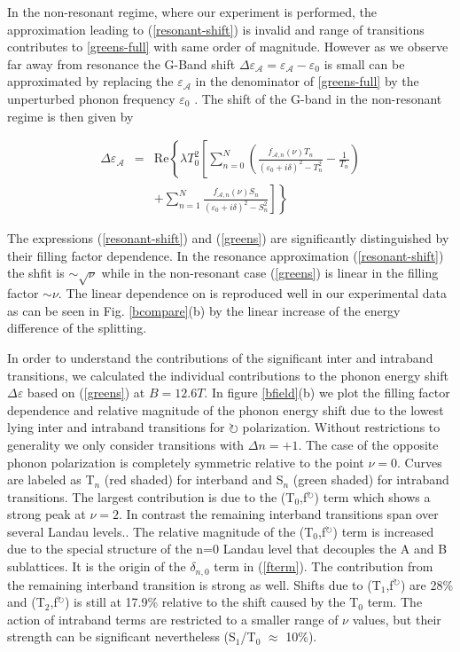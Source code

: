 \documentclass[prl,aps,superscriptaddress,showpacs,reprint]{revtex4-1}
\begin{document}
In the non-resonant regime, where our experiment is performed, the approximation leading to (\ref{resonant-shift}) is invalid and range of transitions contributes to \ref{greens-full} with same order of magnitude. However as we observe far away from resonance the G-Band shift $\Delta\varepsilon_{\mathcal{A}} = \varepsilon_{\mathcal{A}} - \varepsilon_0$ is small can be approximated by replacing the $\varepsilon_{\mathcal{A}}$ in the denominator of \ref{greens-full} by the unperturbed phonon frequency $\varepsilon_0$ \cite{ando2007magnetic}. The shift of the G-band in the non-resonant regime is then given by

\begin{eqnarray}
\label{greens}
\Delta\varepsilon_{\mathcal{A}} &=& \mathrm{Re}\left\lbrace \lambda T_0^2 \left[ \sum_{n=0}^N\left(\frac{f_{\mathcal{A},n}\left(\nu\right) T_n}{\left(\varepsilon_{0}+i\delta\right)^2-T_n^2}-\frac{1}{T_n}\right)\right.\right.\nonumber \\
& &\left.\left. +\sum_{n=1}^{N}\frac{f_{\mathcal{A},n}\left(\nu\right) S_n}{\left(\varepsilon_{0}+i\delta\right)^2-S_n^2}\right]\right\rbrace
\end{eqnarray}

The expressions (\ref{resonant-shift}) and (\ref{greens}) are significantly distinguished by their filling factor dependence. In the resonance approximation (\ref{resonant-shift}) the shfit is $\sim \sqrt{\nu}$ while in the non-resonant case (\ref{greens}) is linear in the filling factor $\sim \nu$. The linear dependence on is reproduced well in our experimental data as can be seen in Fig. \ref{bcompare}(b) by the linear increase of the energy difference of the splitting.

In order to understand the contributions of the significant inter and intraband transitions, we calculated the individual contributions to the phonon energy shift $\Delta\varepsilon$ based on (\ref{greens}) at $B=12.6T$.
In figure \ref{bfield}(b) we plot the filling factor dependence and relative magnitude of the phonon energy shift due to the lowest lying inter and intraband transitions for $\circlearrowright$ polarization. Without restrictions to generality we only consider transitions with $\Delta n =+1$. The case of the opposite phonon polarization is completely symmetric relative to the point $\nu = 0$. Curves are labeled as T$_n$ (red shaded) for interband and S$_n$ (green shaded) for intraband transitions.  The largest contribution is due to the (T$_0$,f$^\circlearrowright$) term which shows a strong peak at $\nu=2$. In contrast the remaining interband transitions span over several Landau levels.. The relative magnitude of the (T$_0$,f$^\circlearrowright$) term is increased due to the special structure of the n=0 Landau level that decouples the A and B sublattices. It is the origin of the $\delta_{n,0}$ term in (\ref{fterm}). The contribution from the remaining interband transition is strong as well. Shifts due to (T$_1$,f$^\circlearrowright$) are 28\% and (T$_2$,f$^\circlearrowright$) is still at 17.9\% relative to the shift caused by the T$_0$ term.
The action of intraband terms are restricted to a smaller range of $\nu$ values, but their strength can be significant nevertheless (S$_1$/T$_0$ $\approx$ 10\%).
\end{document}
